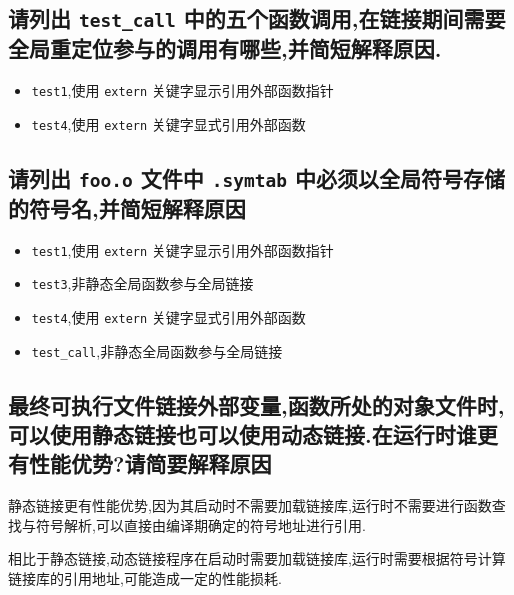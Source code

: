     \subsection{请列出 \texttt{test\_call} 中的五个函数调用,在链接期间需要全局重定位参与的调用有哪些,并简短解释原因.}
    \begin{itemize}
        \item \texttt{test1},使用 \texttt{extern} 关键字显示引用外部函数指针
        \item \texttt{test4},使用 \texttt{extern} 关键字显式引用外部函数
    \end{itemize}
    \subsection{请列出 \texttt{foo.o} 文件中 \texttt{.symtab} 中必须以全局符号存储的符号名,并简短解释原因}
    \begin{itemize}
        \item \texttt{test1},使用 \texttt{extern} 关键字显示引用外部函数指针
        \item \texttt{test3},非静态全局函数参与全局链接
        \item \texttt{test4},使用 \texttt{extern} 关键字显式引用外部函数
        \item \texttt{test\_call},非静态全局函数参与全局链接
    \end{itemize}
    \subsection{最终可执行文件链接外部变量,函数所处的对象文件时,可以使用静态链接也可以使用动态链接.在运行时谁更有性能优势?请简要解释原因}
    静态链接更有性能优势,因为其启动时不需要加载链接库,运行时不需要进行函数查找与符号解析,可以直接由编译期确定的符号地址进行引用.

    相比于静态链接,动态链接程序在启动时需要加载链接库,运行时需要根据符号计算链接库的引用地址,可能造成一定的性能损耗.

